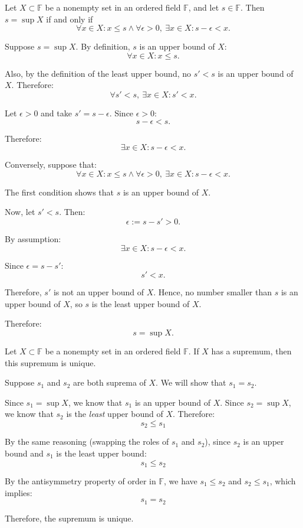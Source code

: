 \begin{theorem}\label{th:sup-characterization}
Let $X \subset \mathbb{F}$ be a nonempty set in an ordered field $\mathbb{F}$, and let $s \in \mathbb{F}$. Then $s = \sup X$ if and only if
$$
\forall x \in X: x \leq s \land \forall \epsilon > 0,\ \exists x \in X: s - \epsilon < x.
$$
\end{theorem}

\begin{bookproof}
Suppose $s = \sup X$. By definition, $s$ is an upper bound of $X$: $$\forall x \in X: x \leq s.$$

Also, by the definition of the least upper bound, no $s' < s$ is an upper bound of $X$. Therefore: $$\forall s' < s,\ \exists x \in X: s' < x.$$

Let $\epsilon > 0$ and take $s' = s - \epsilon$. Since $\epsilon > 0$: $$s - \epsilon < s.$$

Therefore: $$\exists x \in X: s - \epsilon < x.$$

Conversely, suppose that:
$$\forall x \in X: x \leq s \land \forall \epsilon > 0,\ \exists x \in X: s - \epsilon < x.$$

The first condition shows that $s$ is an upper bound of $X$.

Now, let $s' < s$. Then: $$\epsilon := s - s' > 0.$$

By assumption: $$\exists x \in X: s - \epsilon < x.$$

Since $\epsilon = s - s'$:$$s' < x.$$

Therefore, $s'$ is not an upper bound of $X$. Hence, no number smaller than $s$ is an upper bound of $X$, so $s$ is the least upper bound of $X$.

Therefore: $$s = \sup X.$$
\end{bookproof}

\begin{theorem}
Let $X \subset \mathbb{F}$ be a nonempty set in an ordered field $\mathbb{F}$. If $X$ has a supremum, then this supremum is unique.
\end{theorem}

\begin{bookproof}
Suppose $s_1$ and $s_2$ are both suprema of $X$. We will show that $s_1 = s_2$.

Since $s_1 = \sup X$, we know that $s_1$ is an upper bound of $X$. Since $s_2 = \sup X$, we know that $s_2$ is the \textit{least} upper bound of $X$. Therefore:
$$s_2 \leq s_1$$

By the same reasoning (swapping the roles of $s_1$ and $s_2$), since $s_2$ is an upper bound and $s_1$ is the least upper bound:
$$s_1 \leq s_2$$

By the antisymmetry property of order in $\mathbb{F}$, we have $s_1 \leq s_2$ and $s_2 \leq s_1$, which implies:
$$s_1 = s_2$$

Therefore, the supremum is unique.
\end{bookproof}

